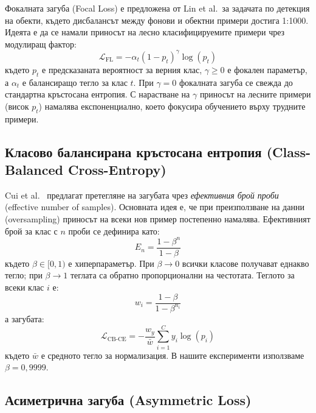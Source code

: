 \documentclass[12pt,a4paper]{report}
\begin{document}
Фокалната загуба (Focal Loss) \cite{lin2017focal} е предложена от Lin et al.\ за задачата по детекция на обекти, където дисбалансът между фонови и обектни примери достига 1:1000. Идеята е да се намали приносът на лесно класифицируемите примери чрез модулиращ фактор:
\begin{equation}
  \mathcal{L}_{\text{FL}} = -\alpha_t (1 - p_t)^{\gamma} \log(p_t)
  \label{eq:focal_loss}
\end{equation}
където $p_t$ е предсказаната вероятност за верния клас, $\gamma \geq 0$ е фокален параметър, а $\alpha_t$ е балансиращо тегло за клас $t$. При $\gamma=0$ фокалната загуба се свежда до стандартна кръстосана ентропия. С нарастване на $\gamma$ приносът на лесните примери (висок $p_t$) намалява експоненциално, което фокусира обучението върху трудните примери.

\subsection{Класово балансирана кръстосана ентропия (Class-Balanced Cross-Entropy)}

Cui et al.\ \cite{cui2019classbalanced} предлагат претегляне на загубата чрез \textit{ефективния брой проби} (effective number of samples). Основната идея е, че при преизползване на данни (oversampling) приносът на всеки нов пример постепенно намалява. Ефективният брой за клас с $n$ проби се дефинира като:
\begin{equation}
  E_n = \frac{1 - \beta^n}{1 - \beta}
  \label{eq:effective_number}
\end{equation}
където $\beta \in [0, 1)$ е хиперпараметър. При $\beta \to 0$ всички класове получават еднакво тегло; при $\beta \to 1$ теглата са обратно пропорционални на честотата. Теглото за всеки клас $i$ е:
\begin{equation}
  w_i = \frac{1 - \beta}{1 - \beta^{n_i}}
  \label{eq:cb_weights}
\end{equation}
а загубата:
\begin{equation}
  \mathcal{L}_{\text{CB-CE}} = -\frac{w_y}{\bar{w}} \sum_{i=1}^{C} y_i \log(p_i)
  \label{eq:cb_ce}
\end{equation}
където $\bar{w}$ е средното тегло за нормализация. В нашите експерименти използваме $\beta=0{,}9999$.

\subsection{Асиметрична загуба (Asymmetric Loss)}
\end{document}

